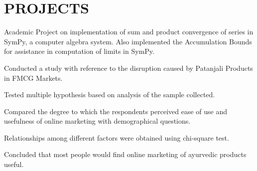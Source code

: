 \documentclass[]{deedy-resume-openfont}
\begin{document}
\begin{minipage}[t]{0.66\textwidth}

\section{PROJECTS}
\vspace{\topsep}
Academic Project on implementation of sum and product convergence of series in SymPy, a computer algebra system.
Also implemented the Accumulation Bounds for assistance in computation of limits in SymPy.
\sectionsep

\vspace{\topsep} %
\begin{tightemize}
\item Conducted a study with reference to the disruption caused by Patanjali Products in FMCG Markets.
\item Tested multiple hypothesis based on analysis of the sample collected.
\item Compared the degree to which the respondents perceived ease of use and usefulness of online marketing with demographical questions.
\item Relationships among different factors were obtained using chi-square test.
\item Concluded that most people would find online marketing of ayurvedic products useful.
\end{tightemize}
\sectionsep

%




\sectionsep


\end{minipage}
\end{document}
